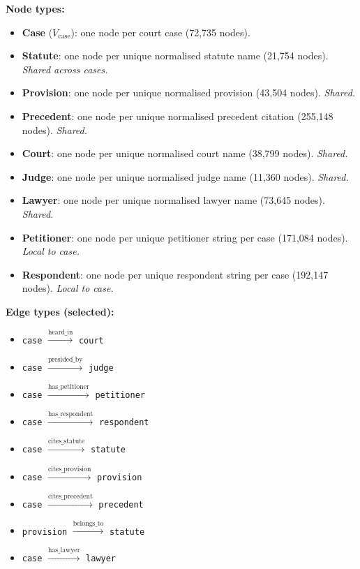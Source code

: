 \documentclass[12pt,a4paper]{report}
\begin{document}
\textbf{Node types:}
\begin{itemize}
  \item \textbf{Case} ($V_\text{case}$): one node per court case (72,735 nodes).
  \item \textbf{Statute}: one node per unique normalised statute name (21,754 nodes). \textit{Shared across cases.}
  \item \textbf{Provision}: one node per unique normalised provision (43,504 nodes). \textit{Shared.}
  \item \textbf{Precedent}: one node per unique normalised precedent citation (255,148 nodes). \textit{Shared.}
  \item \textbf{Court}: one node per unique normalised court name (38,799 nodes). \textit{Shared.}
  \item \textbf{Judge}: one node per unique normalised judge name (11,360 nodes). \textit{Shared.}
  \item \textbf{Lawyer}: one node per unique normalised lawyer name (73,645 nodes). \textit{Shared.}
  \item \textbf{Petitioner}: one node per unique petitioner string per case (171,084 nodes). \textit{Local to case.}
  \item \textbf{Respondent}: one node per unique respondent string per case (192,147 nodes). \textit{Local to case.}
\end{itemize}

\textbf{Edge types (selected):}
\begin{itemize}
  \item \texttt{case} $\xrightarrow{\text{heard\_in}}$ \texttt{court}
  \item \texttt{case} $\xrightarrow{\text{presided\_by}}$ \texttt{judge}
  \item \texttt{case} $\xrightarrow{\text{has\_petitioner}}$ \texttt{petitioner}
  \item \texttt{case} $\xrightarrow{\text{has\_respondent}}$ \texttt{respondent}
  \item \texttt{case} $\xrightarrow{\text{cites\_statute}}$ \texttt{statute}
  \item \texttt{case} $\xrightarrow{\text{cites\_provision}}$ \texttt{provision}
  \item \texttt{case} $\xrightarrow{\text{cites\_precedent}}$ \texttt{precedent}
  \item \texttt{provision} $\xrightarrow{\text{belongs\_to}}$ \texttt{statute}
  \item \texttt{case} $\xrightarrow{\text{has\_lawyer}}$ \texttt{lawyer}
\end{itemize}
\end{document}
